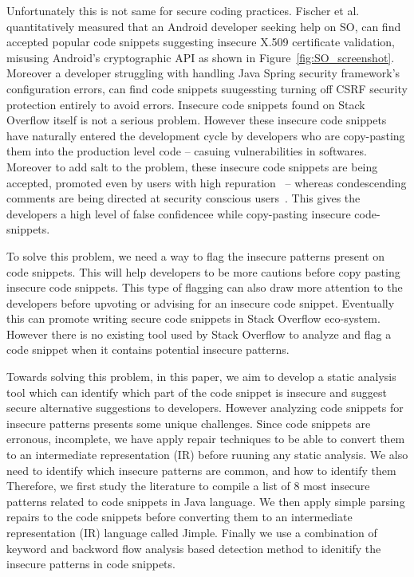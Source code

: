    Unfortunately this is not same for secure coding practices. Fischer et al.~\cite{fischer2017stack} quantitatively measured that an Android developer seeking help on SO, can find accepted popular code snippets suggesting insecure X.509 certificate validation, misusing Android’s cryptographic API  as shown in Figure~\ref{fig:SO_screenshot}. Moreover a developer struggling with handling Java Spring security framework's configuration errors, can find code snippets suugessting turning off CSRF security protection entirely to avoid errors. Insecure code snippets found on Stack Overflow itself is not a serious problem. However 
   these insecure code snippets have naturally entered the development cycle by developers who are copy-pasting them into the production level code -- casuing vulnerabilities in softwares.
   Moreover to add salt to the problem, these insecure code snippets are being accepted, promoted even by users with high repuration~\cite{meng2018secure} -- whereas condescending comments are being directed at security conscious users~\cite{java-so-cyber-bullying}. This gives the developers a high level of false confidencee while copy-pasting insecure code-snippets. 

   
   
   To solve this problem, we need a way to flag the insecure patterns present on code snippets. 
   This will help developers to be more cautions before copy pasting insecure code snippets. This type of flagging can also draw more attention to the developers before upvoting or advising for an insecure code snippet. Eventually this can promote writing secure code snippets in Stack Overflow eco-system.
   However there is no existing tool used by Stack Overflow to analyze and flag a code snippet when it contains potential insecure patterns.
   
   Towards solving this problem, in this paper, we aim to develop a static analysis tool  which can identify which part of the code snippet is insecure and suggest secure alternative suggestions to developers. However analyzing code snippets for insecure patterns presents some unique challenges. Since  code snippets are erronous, incomplete, we have apply repair techniques to be able to convert them to an intermediate representation (IR) before ruuning any static analysis. We also need to identify which insecure patterns are common, and how to identify them %
   Therefore, we first study the literature to compile a list of 8 most insecure patterns related to code snippets in Java language. We then apply simple parsing repairs to the code snippets before converting them to an intermediate representation (IR) language called Jimple. Finally we use a combination of keyword and backword flow analysis based detection method to idenitify the insecure patterns in code snippets. 
   
